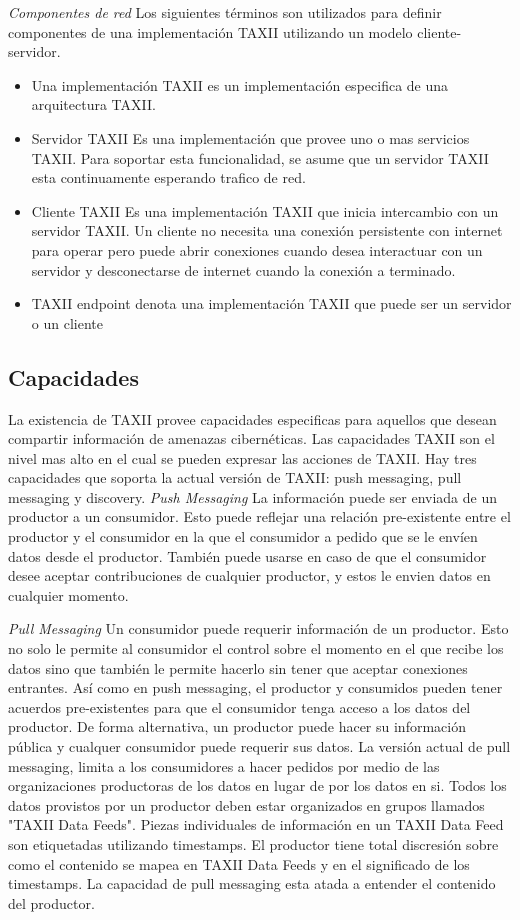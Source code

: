 \emph{Componentes de red}
Los siguientes términos son utilizados para definir componentes de una 
implementación TAXII utilizando un modelo cliente-servidor.
\begin{itemize}
  \item Una implementación TAXII es un implementación especifica de una 
  arquitectura TAXII.
  \item Servidor TAXII Es una implementación que provee uno o mas servicios 
  TAXII. Para soportar esta funcionalidad, se asume que un servidor TAXII esta 
  continuamente esperando trafico de red.
  \item Cliente TAXII Es una implementación TAXII que inicia intercambio con un 
  servidor TAXII. Un cliente no necesita una conexión persistente con internet 
  para operar pero puede abrir conexiones cuando desea interactuar con un 
  servidor y desconectarse de internet cuando la conexión a terminado.
  \item TAXII endpoint denota una implementación TAXII que puede ser un servidor 
  o un cliente
\end{itemize}


\subsection{Capacidades}
La existencia de TAXII provee capacidades especificas para aquellos que desean 
compartir información de amenazas cibernéticas. Las capacidades TAXII son el 
nivel mas alto en el cual se pueden expresar las acciones de TAXII. Hay tres 
capacidades que soporta la actual versión de TAXII: push messaging, pull 
messaging y discovery.
\emph{Push Messaging}
La información puede ser enviada de un productor a un consumidor. Esto puede 
reflejar una relación pre-existente entre el productor y el consumidor en la que 
el consumidor a pedido que se le envíen datos desde el productor. También puede 
usarse en caso de que el consumidor desee aceptar contribuciones de cualquier 
productor, y estos le envien datos en cualquier momento.

\emph{Pull Messaging}
Un consumidor puede requerir información de un productor. Esto no solo le 
permite al consumidor el control sobre el momento en el que recibe los datos 
sino que también le permite hacerlo sin tener que aceptar conexiones entrantes. 
Así como en push messaging, el productor y consumidos pueden tener acuerdos 
pre-existentes  para que el consumidor tenga acceso a los datos del productor. 
De forma alternativa, un productor puede hacer su información pública  y 
cualquer consumidor puede requerir sus datos.
La versión actual de pull messaging, limita a los consumidores a hacer pedidos 
por medio de las organizaciones productoras de los datos en lugar de por los 
datos en si. Todos los datos provistos por un productor deben estar organizados 
en grupos llamados "TAXII Data Feeds". Piezas individuales de información en un 
TAXII Data Feed son etiquetadas utilizando timestamps. El productor tiene total 
discresión sobre como el contenido se mapea en TAXII Data Feeds y en el 
significado de los timestamps. La capacidad de pull messaging esta atada a 
entender el contenido del productor.

